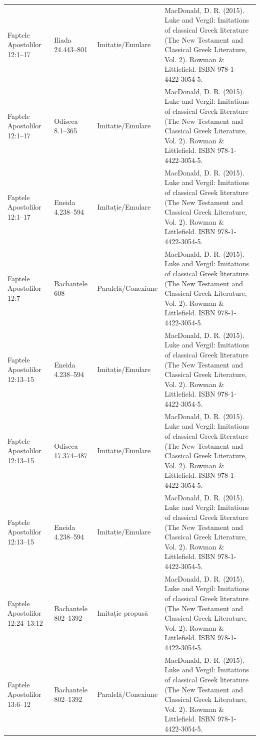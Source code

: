 \documentclass[12pt,a4paper,twoside,openany]{book}
\begin{document}
\begin{longtable}{L{1.4cm}L{1.7cm}L{3.1cm}L{8.4cm}}
Faptele Apostolilor 12:1–17 & Iliada 24.443–801 & Imitație/Emulare & MacDonald, D. R. (2015). Luke and Vergil: Imitations of classical Greek literature (The New Testament and Classical Greek Literature, Vol. 2). Rowman \& Littlefield. ISBN 978-1-4422-3054-5. \\
Faptele Apostolilor 12:1–17 & Odiseea 8.1–365 & Imitație/Emulare & MacDonald, D. R. (2015). Luke and Vergil: Imitations of classical Greek literature (The New Testament and Classical Greek Literature, Vol. 2). Rowman \& Littlefield. ISBN 978-1-4422-3054-5. \\
Faptele Apostolilor 12:1–17 & Eneida 4.238–594 & Imitație/Emulare & MacDonald, D. R. (2015). Luke and Vergil: Imitations of classical Greek literature (The New Testament and Classical Greek Literature, Vol. 2). Rowman \& Littlefield. ISBN 978-1-4422-3054-5. \\
Faptele Apostolilor 12:7 & Bachantele 608 & Paralelă/Conexiune & MacDonald, D. R. (2015). Luke and Vergil: Imitations of classical Greek literature (The New Testament and Classical Greek Literature, Vol. 2). Rowman \& Littlefield. ISBN 978-1-4422-3054-5. \\
Faptele Apostolilor 12:13–15 & Eneida 4.238–594 & Imitație/Emulare & MacDonald, D. R. (2015). Luke and Vergil: Imitations of classical Greek literature (The New Testament and Classical Greek Literature, Vol. 2). Rowman \& Littlefield. ISBN 978-1-4422-3054-5. \\
Faptele Apostolilor 12:13–15 & Odiseea 17.374–487 & Imitație/Emulare & MacDonald, D. R. (2015). Luke and Vergil: Imitations of classical Greek literature (The New Testament and Classical Greek Literature, Vol. 2). Rowman \& Littlefield. ISBN 978-1-4422-3054-5. \\
Faptele Apostolilor 12:13–15 & Eneida 4.238–594 & Imitație/Emulare & MacDonald, D. R. (2015). Luke and Vergil: Imitations of classical Greek literature (The New Testament and Classical Greek Literature, Vol. 2). Rowman \& Littlefield. ISBN 978-1-4422-3054-5. \\
Faptele Apostolilor 12:24–13:12 & Bachantele 802–1392 & Imitație propusă & MacDonald, D. R. (2015). Luke and Vergil: Imitations of classical Greek literature (The New Testament and Classical Greek Literature, Vol. 2). Rowman \& Littlefield. ISBN 978-1-4422-3054-5. \\
Faptele Apostolilor 13:6–12 & Bachantele 802–1392 & Paralelă/Conexiune & MacDonald, D. R. (2015). Luke and Vergil: Imitations of classical Greek literature (The New Testament and Classical Greek Literature, Vol. 2). Rowman \& Littlefield. ISBN 978-1-4422-3054-5. \\

\end{longtable}
\end{document}
